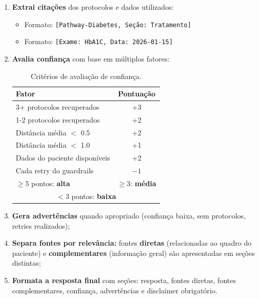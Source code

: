 \begin{enumerate}
    \item \textbf{Extrai citações} dos protocolos e dados utilizados:
    \begin{itemize}
        \item Formato: \texttt{[Pathway-Diabetes, Seção: Tratamento]}
        \item Formato: \texttt{[Exame: HbA1C, Data: 2026-01-15]}
    \end{itemize}

    \item \textbf{Avalia confiança} com base em múltiplos fatores:

    \begin{table}[H]
    \centering
    \caption{Critérios de avaliação de confiança.}
    \label{tab:confianca}
    \begin{tabular}{l c}
    \toprule
    \textbf{Fator} & \textbf{Pontuação} \\
    \midrule
    3+ protocolos recuperados & +3 \\
    1-2 protocolos recuperados & +2 \\
    Distância média $<$ 0.5 & +2 \\
    Distância média $<$ 1.0 & +1 \\
    Dados do paciente disponíveis & +2 \\
    Cada retry do guardrails & $-1$ \\
    \midrule
    $\geq 5$ pontos: \textbf{alta} & $\geq 3$: \textbf{média} \\
    \multicolumn{2}{c}{$< 3$ pontos: \textbf{baixa}} \\
    \bottomrule
    \end{tabular}
    \end{table}

    \item \textbf{Gera advertências} quando apropriado (confiança baixa, sem protocolos, retries realizados);

    \item \textbf{Separa fontes por relevância:} fontes \textbf{diretas} (relacionadas ao quadro do paciente) e \textbf{complementares} (informação geral) são apresentadas em seções distintas;

    \item \textbf{Formata a resposta final} com seções: resposta, fontes diretas, fontes complementares, confiança, advertências e disclaimer obrigatório.
\end{enumerate}

